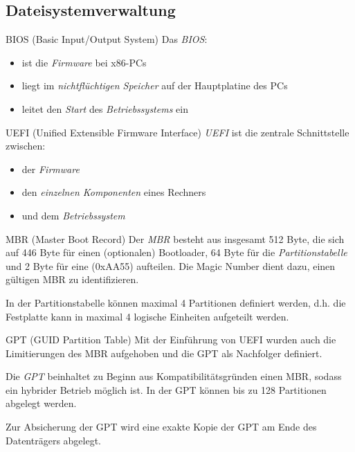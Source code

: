 \newpage
\subsection{Dateisystemverwaltung}

\begin{defi}{BIOS (Basic Input/Output System)}
    Das \emph{BIOS}:
    \begin{itemize}
        \item ist die \emph{Firmware} bei x86-PCs
        \item liegt im \emph{nichtflüchtigen Speicher} auf der Hauptplatine des PCs
        \item leitet den \emph{Start} des \emph{Betriebssystems} ein
    \end{itemize}
\end{defi}

\begin{defi}{UEFI (Unified Extensible Firmware Interface)}
    \emph{UEFI} ist die zentrale Schnittstelle zwischen:
    \begin{itemize}
        \item der \emph{Firmware}
        \item den \emph{einzelnen Komponenten} eines Rechners
        \item und dem \emph{Betriebssystem}
    \end{itemize}
\end{defi}

\begin{bonus}{MBR (Master Boot Record)}
    Der \emph{MBR} besteht aus insgesamt 512 Byte, die sich auf 446 Byte
    für einen (optionalen) Bootloader, 64 Byte für die \emph{Partitionstabelle} und 2 Byte
    für eine \emph{} (0xAA55) aufteilen. Die Magic Number dient dazu, einen
    gültigen MBR zu identifizieren.

    In der Partitionstabelle können maximal 4 Partitionen
    definiert werden, d.h. die Festplatte kann in maximal 4 logische Einheiten aufgeteilt
    werden.
\end{bonus}

\begin{bonus}{GPT (GUID Partition Table)}
    Mit der Einführung von UEFI wurden auch die Limitierungen des
    MBR aufgehoben und die GPT als Nachfolger definiert.

    Die \emph{GPT} beinhaltet zu Beginn
    aus Kompatibilitätsgründen einen MBR, sodass ein hybrider Betrieb möglich
    ist. In der GPT können bis zu 128 Partitionen abgelegt werden.

    Zur Absicherung der
    GPT wird eine exakte Kopie der GPT am Ende des Datenträgers abgelegt.
\end{bonus}

